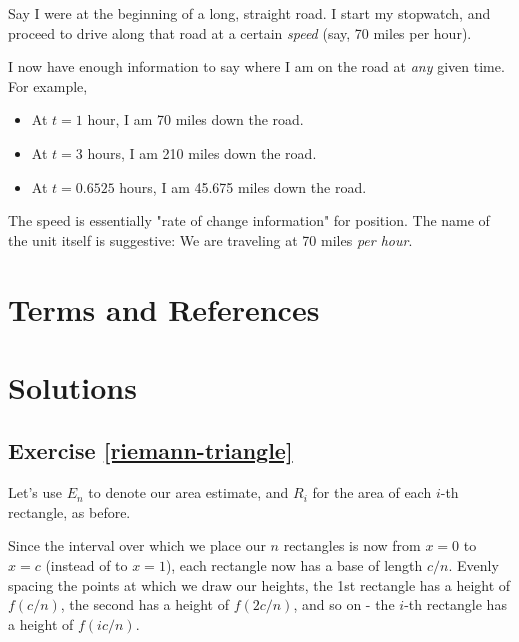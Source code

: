 \documentclass{book}
\begin{document}







Say I were at the beginning of a long, straight road. I start my stopwatch, and proceed to drive along that road at a certain \emph{speed} (say, 70 miles per hour). 

I now have enough information to say where I am on the road at \emph{any} given time. For example, 

\begin{itemize}
\item At $t = 1$ hour, I am 70 miles down the road.
\item At $t = 3$ hours, I am 210 miles down the road.
\item At $t = 0.6525$ hours, I am 45.675 miles down the road.
\end{itemize}

The speed is essentially "rate of change information" for position. The name of the unit itself is suggestive: We are traveling at 70 miles \emph{per hour}.






\section{Terms and References}

\section{Solutions}

\subsection{Exercise \ref{riemann-triangle}}

Let's use $E_n$ to denote our area estimate, and $R_i$ for the area of each $i$-th rectangle, as before. 

Since the interval over which we place our $n$ rectangles is now from $x = 0$ to $x = c$ (instead of to $x = 1$), each rectangle now has a base of length $c/n$. Evenly spacing the points at which we draw our heights, the 1st rectangle has a height of $f(c/n)$, the second has a height of $f(2c/n)$, and so on - the $i$-th rectangle has a height of $f(ic/n)$. 
\end{document}
